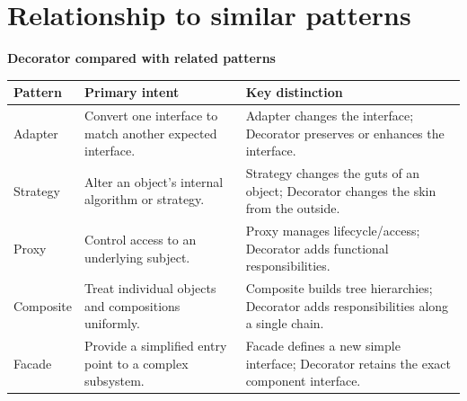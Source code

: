 \documentclass[11pt,a4paper]{report}
\begin{document}
\section{Relationship to similar patterns}
\begin{center}
\textbf{Decorator compared with related patterns}\par\medskip
\centering
\small
\begin{tabularx}{\textwidth}{@{}lYY@{}}
\toprule
\textbf{Pattern} & \textbf{Primary intent} & \textbf{Key distinction} \\
\midrule
Adapter & Convert one interface to match another expected interface. & Adapter changes the interface; Decorator preserves or enhances the interface. \\
Strategy & Alter an object's internal algorithm or strategy. & Strategy changes the guts of an object; Decorator changes the skin from the outside. \\
Proxy & Control access to an underlying subject. & Proxy manages lifecycle/access; Decorator adds functional responsibilities. \\
Composite & Treat individual objects and compositions uniformly. & Composite builds tree hierarchies; Decorator adds responsibilities along a single chain. \\
Facade & Provide a simplified entry point to a complex subsystem. & Facade defines a new simple interface; Decorator retains the exact component interface. \\
\bottomrule
\end{tabularx}
\end{center}
\end{document}
